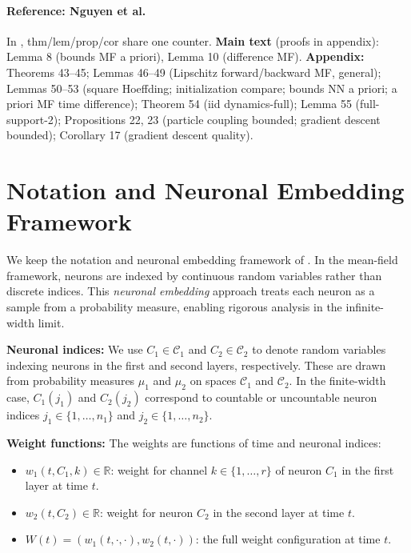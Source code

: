 \documentclass[nohyperref]{article}
\theoremstyle{plain}
\theoremstyle{definition}
\theoremstyle{remark}
\begin{document}
\paragraph{Reference: Nguyen et al.} In \cite{nguyen2023rigorousframeworkmeanfield}, thm/lem/prop/cor share one counter. \textbf{Main text} (proofs in appendix): Lemma 8 (bounds MF a priori), Lemma 10 (difference MF). \textbf{Appendix:} Theorems 43--45; Lemmas 46--49 (Lipschitz forward/backward MF, general); Lemmas 50--53 (square Hoeffding; initialization compare; bounds NN a priori; a priori MF time difference); Theorem 54 (iid dynamics-full); Lemma 55 (full-support-2); Propositions 22, 23 (particle coupling bounded; gradient descent bounded); Corollary 17 (gradient descent quality).






\section{Notation and Neuronal Embedding Framework}
\label{app:notation}

We keep the notation and neuronal embedding framework of \cite{nguyen2023rigorousframeworkmeanfield}. In the mean-field framework, neurons are indexed by continuous random variables rather than discrete indices. This \emph{neuronal embedding} approach treats each neuron as a sample from a probability measure, enabling rigorous analysis in the infinite-width limit.

\textbf{Neuronal indices:} We use $C_1 \in \mathcal{C}_1$ and $C_2 \in \mathcal{C}_2$ to denote random variables indexing neurons in the first and second layers, respectively. These are drawn from probability measures $\mu_1$ and $\mu_2$ on spaces $\mathcal{C}_1$ and $\mathcal{C}_2$. In the finite-width case, $C_1(j_1)$ and $C_2(j_2)$ correspond to countable or uncountable neuron indices $j_1 \in \{1,\ldots,n_1\}$ and $j_2 \in \{1,\ldots,n_2\}$.

\textbf{Weight functions:} The weights are functions of time and neuronal indices:
\begin{itemize}
\item $w_1(t, C_1, k) \in \mathbb{R}$: weight for channel $k \in \{1,\ldots,r\}$ of neuron $C_1$ in the first layer at time $t$.
\item $w_2(t, C_2) \in \mathbb{R}$: weight for neuron $C_2$ in the second layer at time $t$.
\item $W(t) = (w_1(t, \cdot, \cdot), w_2(t, \cdot))$: the full weight configuration at time $t$.
\end{itemize}
\end{document}
